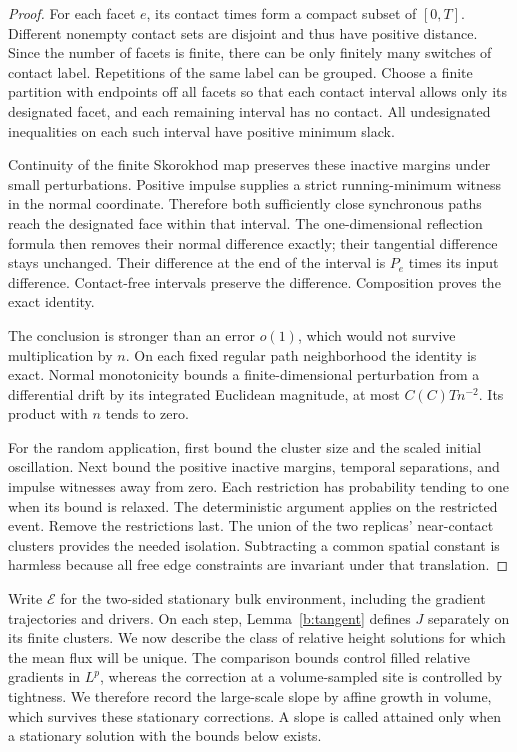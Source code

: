 \begin{proof}
For each facet $e$, its contact times form a compact subset of $[0,T]$.
Different nonempty contact sets are disjoint and thus have positive
distance. Since the number of facets is finite, there can be only finitely
many switches of contact label. Repetitions of the same label can be grouped.
Choose a finite partition with endpoints off all facets so that each
contact interval allows only its designated facet, and each remaining
interval has no contact. All undesignated inequalities on each such
interval have positive minimum slack.

Continuity of the finite Skorokhod map preserves these inactive margins
under small perturbations. Positive impulse supplies a strict running-minimum
witness in the normal coordinate. Therefore both sufficiently close
synchronous paths reach the designated face within that interval. The
one-dimensional reflection formula then removes their normal difference
exactly; their tangential difference stays unchanged. Their difference at
the end of the interval is $P_e$ times its input difference. Contact-free
intervals preserve the difference. Composition proves the exact identity.

The conclusion is stronger than an error $o(1)$, which would not survive
multiplication by $n$. On each fixed regular path neighborhood the identity
is exact. Normal monotonicity bounds a finite-dimensional perturbation
from a differential drift by its integrated Euclidean magnitude, at most
$C(C)Tn^{-2}$. Its product with $n$ tends to zero.

For the random application, first bound the cluster size and the scaled
initial oscillation. Next bound the positive inactive margins, temporal
separations, and impulse witnesses away from zero. Each restriction has
probability tending to one when its bound is relaxed. The deterministic
argument applies on the restricted event. Remove the restrictions last.
The union of the two replicas' near-contact clusters provides the needed
isolation. Subtracting a common spatial constant is harmless because all
free edge constraints are invariant under that translation.
\end{proof}

Write $\mathcal E$ for the two-sided stationary bulk environment, including
the gradient trajectories and drivers. On each step, Lemma~\ref{b:tangent}
defines $J$ separately on its finite clusters. We now describe the class of
relative height solutions for which the mean flux will be unique.
The comparison bounds control filled relative gradients in $L^p$, whereas
the correction at a volume-sampled site is controlled by tightness.
We therefore record the large-scale slope by affine growth in volume,
which survives these stationary corrections. A slope is called attained
only when a stationary solution with the bounds below exists.

